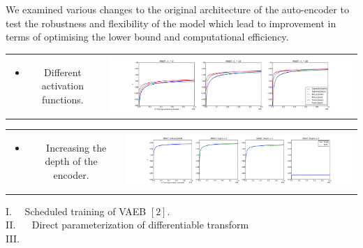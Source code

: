 \documentclass[landscape,a0b,final,a4resizeable]{include/a0poster}
\begin{document}
\begin{poster}
\begin{multicols}{3}
We examined various changes to the original architecture of the auto-encoder to test the robustness and flexibility of the model which lead to improvement in terms of optimising the lower bound and computational efficiency.

\begin{tabular}{cc}
\begin{minipage}[c]{0.25\columnwidth}
\begin{itemize}
\item Different activation functions.
\end{itemize}
\end{minipage} & 
\begin{minipage}[c]{0.75\columnwidth}
\includegraphics[width=1.0\columnwidth, clip, trim=4mm 0mm 4mm 4mm]{../res/mnist_activations}
\end{minipage}
\end{tabular}

\vspace{0.5em}

\begin{tabular}{cc}
\begin{minipage}[c]{0.25\columnwidth}
\begin{itemize}
\item ~~Increasing the depth of the encoder.
\end{itemize}
\end{minipage} & 
\begin{minipage}[c]{0.75\columnwidth}
\includegraphics[width=1.0\columnwidth, clip, trim=4mm 0mm 4mm 4mm]{../res/mnist_depth}
\end{minipage}
\end{tabular}

\vspace{0.5em}

I.~~ Scheduled training of VAEB $[2]$.\\
II. ~~ Direct parameterization of differentiable transform \\
III. ~~\\
\vspace{0.5em}


\end{multicols}
\end{poster}
\end{document}
